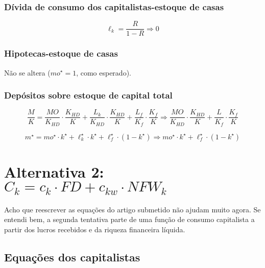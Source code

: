 \documentclass[11pt]{article}
\begin{document}
\subsubsection*{Dívida de consumo dos capitalistas-estoque de casas}
\label{sec:org54c5760}

\begin{latex}
\begin{equation}
\ell_{k} = \frac{R}{1 - R} \Rightarrow 0
\end{equation}
\end{latex}

\subsubsection*{Hipotecas-estoque de casas}
\label{sec:org2e11ab0}

Não se altera (\(mo^{\star} = 1\), como esperado).

\subsubsection*{Depósitos sobre estoque de capital total}
\label{sec:org0c7b6ec}

$$
\frac{M}{K} = \frac{MO}{K_{HD}}\cdot \frac{K_{HD}}{K} +  \frac{L_k}{K_{HD}}\cdot \frac{K_{HD}}{K} +  \frac{L_f}{K_{f}}\cdot \frac{K_{f}}{K} \Rightarrow
\frac{MO}{K_{HD}}\cdot \frac{K_{HD}}{K} +  \frac{L}{K_{f}}\cdot \frac{K_{f}}{K}
$$

\begin{latex}
\begin{equation}
m^{\star} = mo^{\star}\cdot k^{\star} + \ell^{\star}_{k}\cdot k^{\star} + \ell^{\star}_{f}\cdot (1-k^{\star}) \Rightarrow  mo^{\star}\cdot k^{\star} + \ell^{\star}_{f}\cdot (1-k^{\star})
\end{equation}
\end{latex}

\section*{Alternativa 2: \(C_{k} = c_{k}\cdot FD + c_{kw}\cdot NFW_{k}\)}
\label{sec:orgb408259}

Acho que reescrever as equações do artigo submetido não ajudam muito agora.
Se entendi bem, a segunda tentativa parte de uma função de consumo capitalista a partir dos lucros recebidos e da riqueza financeira líquida.

\subsection*{Equações dos capitalistas}
\label{sec:orgc9d5539}
\end{document}
